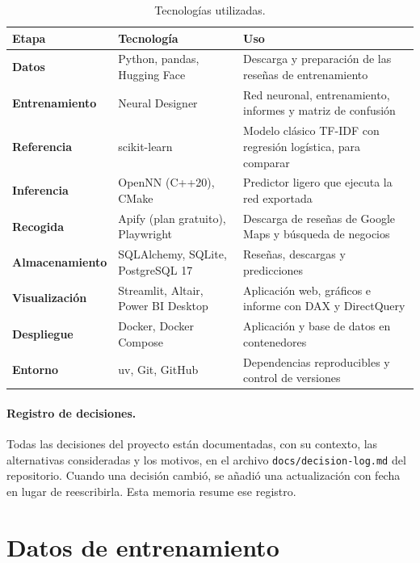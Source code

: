 \documentclass[11pt,a4paper]{article}
\newcommand{\code}[1]{\texttt{\small #1}}
\begin{document}
\begin{table}[htbp]
\centering\small
\caption{Tecnologías utilizadas.}
\label{tab:tecnologias}
\begin{tabularx}{\linewidth}{@{}>{\bfseries}l l X@{}}
\toprule
Etapa & Tecnología & Uso \\
\midrule
Datos            & Python, pandas, Hugging Face        & Descarga y preparación de las reseñas de entrenamiento \\
Entrenamiento    & Neural Designer                     & Red neuronal, entrenamiento, informes y matriz de confusión \\
Referencia       & scikit-learn                        & Modelo clásico TF-IDF con regresión logística, para comparar \\
Inferencia       & OpenNN (C++20), CMake               & Predictor ligero que ejecuta la red exportada \\
Recogida         & Apify (plan gratuito), Playwright   & Descarga de reseñas de Google Maps y búsqueda de negocios \\
Almacenamiento   & SQLAlchemy, SQLite, PostgreSQL 17   & Reseñas, descargas y predicciones \\
Visualización    & Streamlit, Altair, Power BI Desktop & Aplicación web, gráficos e informe con DAX y DirectQuery \\
Despliegue       & Docker, Docker Compose              & Aplicación y base de datos en contenedores \\
Entorno          & uv, Git, GitHub                     & Dependencias reproducibles y control de versiones \\
\bottomrule
\end{tabularx}
\end{table}

\paragraph{Registro de decisiones.} Todas las decisiones del proyecto están documentadas, con su contexto, las
alternativas consideradas y los motivos, en el archivo \code{docs/decision-log.md} del repositorio. Cuando una decisión
cambió, se añadió una actualización con fecha en lugar de reescribirla. Esta memoria resume ese registro.

\section{Datos de entrenamiento}
\end{document}
